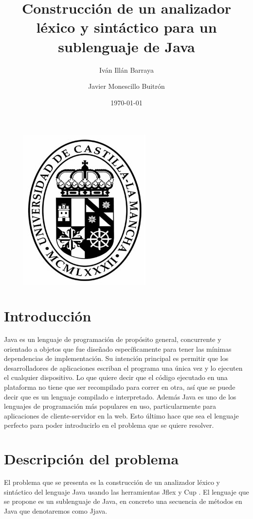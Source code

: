 \documentclass[12pt,a4paper]{article}
\author{ Iván Illán Barraya \and Javier Monescillo Buitrón}
\title{Construcción de un analizador léxico y sintáctico para un sublenguaje de Java}
\date{\today}
\begin{document}
	
	\maketitle
	
	\begin{figure}[h]
		\centering
		\includegraphics[width=0.25
		\linewidth]{img/uclm}
		\caption{}
		\label{fig:image004}
	\end{figure}

	\newpage
	\tableofcontents
	\newpage
	
\section{Introducción}
Java \cite{JGosling} es un lenguaje de programación de propósito general, concurrente y orientado a objetos que fue diseñado específicamente para tener las mínimas dependencias de implementación. Su intención principal es permitir que los desarrolladores de aplicaciones escriban el programa una única vez y lo ejecuten el cualquier dispositivo.
\newline\newline
Lo que quiere decir que el código ejecutado en una plataforma no tiene que ser recompilado para correr en otra, así que se puede decir que es un lenguaje compilado e interpretado.
Además Java es uno de los lenguajes de programación más populares en uso, particularmente para aplicaciones de cliente-servidor en la web.
\newline\newline
Esto último hace que sea el lenguaje perfecto para poder introducirlo en el problema que se quiere resolver.


\section{Descripción del problema}
El problema que se presenta es la construcción de un analizador léxico y sintáctico del lenguaje Java usando las herramientas Jflex y Cup \cite{rojas2005java}.\newline\newline
El lenguaje que se propone es un sublenguaje de Java, en concreto una secuencia de métodos en Java que denotaremos como Jjava.
\end{document}
